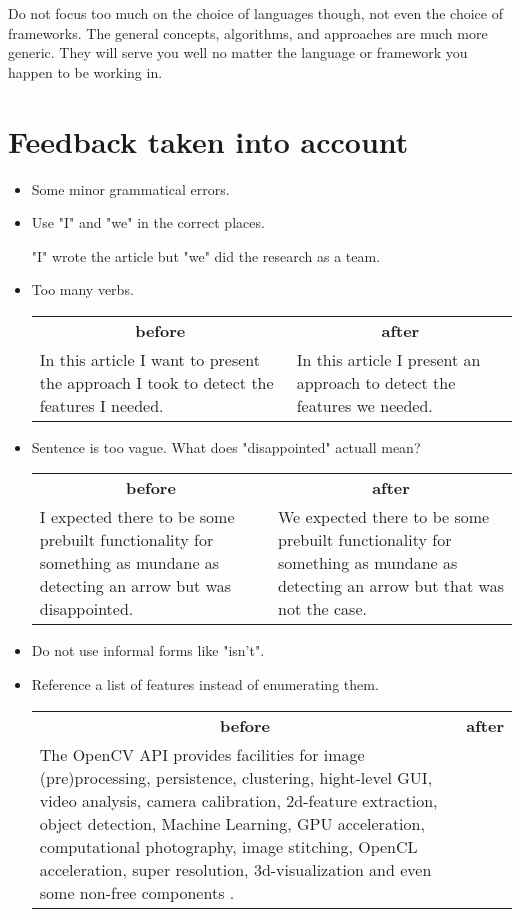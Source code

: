 \documentclass[12pt, a4paper]{article}
\begin{document}
Do not focus too much on the choice of languages though, not even the choice of frameworks. The general concepts, algorithms, and approaches are much more generic. They will serve you well no matter the language or framework you happen to be working in.

\printbibliography

\section{Feedback taken into account}
\begin{itemize}
	\item Some minor grammatical errors.
	\item Use "I" and "we" in the correct places.

	"I" wrote the article but "we" did the research as a team.
	\item Too many verbs.

	\begin{tabular}{p{.5\linewidth} p{.5\linewidth}}
		\multicolumn{1}{c}{\textbf{before}} & \multicolumn{1}{c}{\textbf{after}}\\
		In this article I want to present the approach I took to detect the features I needed.&
		In this article I present an approach to detect the features we needed.\\
	\end{tabular}

	\item Sentence is too vague. What does "disappointed" actuall mean?

	\begin{tabular}{p{.5\linewidth} p{.5\linewidth}}
		\multicolumn{1}{c}{\textbf{before}} & \multicolumn{1}{c}{\textbf{after}}\\
		I expected there to be some prebuilt functionality for something as mundane as detecting an arrow but was disappointed.&
		We expected there to be some prebuilt functionality for something as mundane as detecting an arrow but that was not the case.\\
	\end{tabular}

	\item Do not use informal forms like "isn't".
	\item Reference a list of features instead of enumerating them.

	\begin{tabular}{p{.5\linewidth} p{.5\linewidth}}
		\multicolumn{1}{c}{\textbf{before}} & \multicolumn{1}{c}{\textbf{after}}\\
		The OpenCV API provides facilities for image (pre)processing, persistence, clustering, hight-level GUI, video analysis, camera calibration, 2d-feature extraction, object detection, Machine Learning, GPU acceleration, computational photography, image stitching, OpenCL acceleration, super resolution, 3d-visualization and even some non-free components \cite{openCVNonFree}.


\end{tabular}
\end{itemize}
\end{document}
